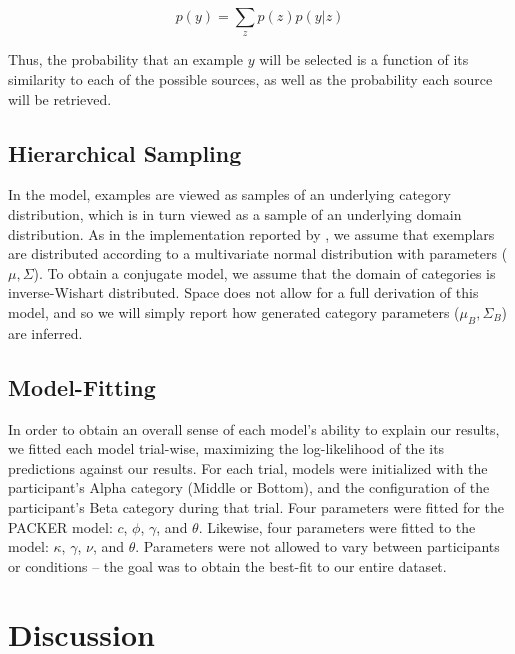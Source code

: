 \documentclass[10pt,letterpaper]{article}
\begin{document}
\begin{equation}
  p(y) = \sum_z{p(z)p(y|z) }
\end{equation}

Thus, the probability that an example $y$ will be selected is a function of its similarity to each of the possible sources, as well as the probability each source will be retrieved.


\subsection{Hierarchical Sampling}

In the \cite{jern2013probabilistic} model, examples are viewed as samples of an underlying category distribution, which is in turn viewed as a sample of an underlying domain distribution. As in the implementation reported by \cite{jern2013probabilistic}, we assume that exemplars are distributed according to a multivariate normal distribution with parameters ($\mu, \Sigma$). To obtain a conjugate model, we assume that the domain of categories is inverse-Wishart distributed. Space does not allow for a full derivation of this model, and so we will simply report how generated category parameters ($\mu_B, \Sigma_B$) are inferred.




\subsection{Model-Fitting}
In order to obtain an overall sense of each model's ability to explain our results, we fitted each model trial-wise, maximizing the log-likelihood of the its predictions against our results. For each trial, models were initialized with the participant's Alpha category (Middle or Bottom), and the configuration of the participant's Beta category during that trial. Four parameters were fitted for the PACKER model: $c$, $\phi$, $\gamma$, and $\theta$. Likewise, four parameters were fitted to the \cite{jern2013probabilistic} model: $\kappa$, $\gamma$, $\nu$, and $\theta$. Parameters were not allowed to vary between participants or conditions -- the goal was to obtain the best-fit to our entire dataset.

\section{Discussion}
\end{document}
